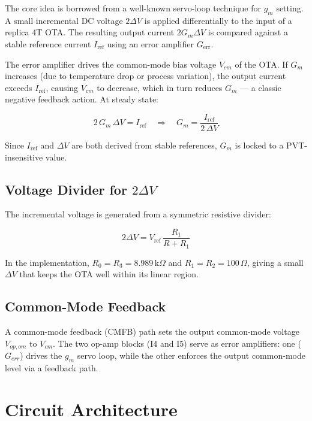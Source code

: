 \documentclass[12pt,a4paper]{article}
\begin{document}
The core idea is borrowed from a well-known servo-loop technique for $g_m$ setting. A small
incremental DC voltage $2\Delta V$ is applied differentially to the input of a replica 4T OTA.
The resulting output current $2G_m\Delta V$ is compared against a stable reference current
$I_{\text{ref}}$ using an error amplifier $G_{\text{err}}$.

The error amplifier drives the common-mode bias voltage $V_{cm}$ of the OTA. If $G_m$
increases (due to temperature drop or process variation), the output current exceeds
$I_{\text{ref}}$, causing $V_{cm}$ to decrease, which in turn reduces $G_m$ — a classic
negative feedback action. At steady state:

\begin{equation}
  2\,G_m\,\Delta V = I_{\text{ref}}
  \quad\Longrightarrow\quad
  G_m = \frac{I_{\text{ref}}}{2\,\Delta V}
\end{equation}

Since $I_{\text{ref}}$ and $\Delta V$ are both derived from stable references, $G_m$ is
locked to a PVT-insensitive value.

\subsection{Voltage Divider for $2\Delta V$}

The incremental voltage is generated from a symmetric resistive divider:

\begin{equation}
  2\Delta V = V_{\text{ref}}\,\frac{R_1}{R + R_1}
\end{equation}

In the implementation, $R_0 = R_3 = 8.989\,\text{k}\Omega$ and $R_1 = R_2 = 100\,\Omega$,
giving a small $\Delta V$ that keeps the OTA well within its linear region.

\subsection{Common-Mode Feedback}

A common-mode feedback (CMFB) path sets the output common-mode voltage $V_{op,om}$ to $V_{cm}$.
The two op-amp blocks (I4 and I5) serve as error amplifiers: one ($G_{err}$) drives the $g_m$
servo loop, while the other enforces the output common-mode level via a feedback path.

\section{Circuit Architecture}
\end{document}
